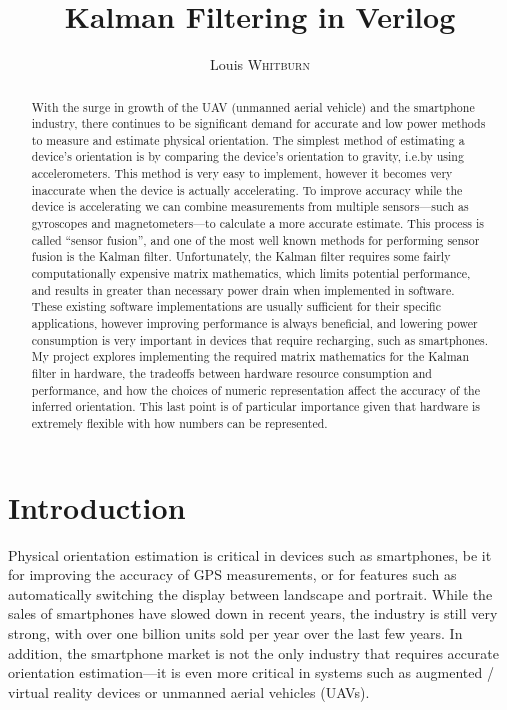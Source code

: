 \documentclass[12pt]{article}
\title{Kalman Filtering in Verilog}
\author{Louis \textsc{Whitburn}}
\begin{document}
\maketitle

\begin{abstract}

With the surge in growth of the UAV (unmanned aerial vehicle) and the smartphone industry, there continues to be significant demand for accurate and low power methods to measure and estimate physical orientation. The simplest method of estimating a device's orientation is by comparing the device's orientation to gravity, i.e.\@ by using accelerometers. This method is very easy to implement, however it becomes very inaccurate when the device is actually accelerating. To improve accuracy while the device is accelerating we can combine measurements from multiple sensors---such as gyroscopes and magnetometers---to calculate a more accurate estimate. This process is called ``sensor fusion'', and one of the most well known methods for performing sensor fusion is the Kalman filter. Unfortunately, the Kalman filter requires some fairly computationally expensive matrix mathematics, which limits potential performance, and results in greater than necessary power drain when implemented in software. These existing software implementations are usually sufficient for their specific applications, however improving performance is always beneficial, and lowering power consumption is very important in devices that require recharging, such as smartphones. My project explores implementing the required matrix mathematics for the Kalman filter in hardware, the tradeoffs between hardware resource consumption and performance, and how the choices of numeric representation affect the accuracy of the inferred orientation. This last point is of particular importance given that hardware is extremely flexible with how numbers can be represented. 

\end{abstract}

\section{Introduction}

Physical orientation estimation is critical in devices such as smartphones, be it for improving the accuracy of GPS measurements, or for features such as automatically switching the display between landscape and portrait. While the sales of smartphones have slowed down in recent years, the industry is still very strong, with over one billion units sold per year \cite{Mongardini_2020} over the last few years. In addition, the smartphone market is not the only industry that requires accurate orientation estimation---it is even more critical in systems such as augmented / virtual reality devices or unmanned aerial vehicles (UAVs).
\end{document}
